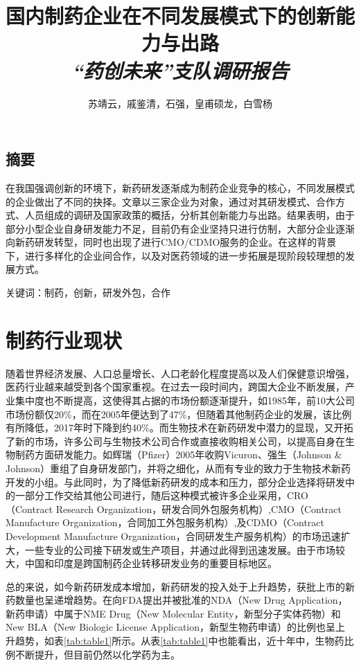 \documentclass[twocolumn]{ctexbook}
\title{\textbf{国内制药企业在不同发展模式下的创新能力与出路}\\{\textit{“药创未来”支队调研报告}}}
\author{苏靖云，戚鉴清，石强，皇甫硕龙，白雪杨}
\begin{document}
\frontmatter
\onecolumn

\begin{spacing}{2.0}
\chapter{摘要}
	

	


	在我国强调创新的环境下，新药研发逐渐成为制药企业竞争的核心，不同发展模式的企业做出了不同的抉择。文章以三家企业为对象，通过对其研发模式、合作方式、人员组成的调研及国家政策的概括，分析其创新能力与出路。结果表明，由于部分小型企业自身研发能力不足，目前仍有企业坚持只进行仿制，大部分企业逐渐向新药研发转型，同时也出现了进行CMO/CDMO服务的企业。在这样的背景下，进行多样化的企业间合作，以及对医药领域的进一步拓展是现阶段较理想的发展方式。
	
	关键词：制药，创新，研发外包，合作



\tableofcontents
\end{spacing}
\twocolumn
\mainmatter

\chapter{制药行业现状}

随着世界经济发展、人口总量增长、人口老龄化程度提高以及人们保健意识增强，医药行业越来越受到各个国家重视。在过去一段时间内，跨国大企业不断发展，产业集中度也不断提高，这使得其占据的市场份额逐渐提升，如1985年，前10大公司市场份额仅20\%，而在2005年便达到了47\%\citep{RN7}，但随着其他制药企业的发展，该比例有所降低，2017年时下降到约40\%\citep{RN1}。而生物技术在新药研发中潜力的显现，又开拓了新的市场，许多公司与生物技术公司合作或直接收购相关公司，以提高自身在生物制药方面研发能力\citep{RN8}。如辉瑞（Pfizer）2005年收购Vicuron、强生（Johnson \& Johnson）重组了自身研发部门，并将之细化，从而有专业的致力于生物技术新药开发的小组。与此同时，为了降低新药研发的成本和压力，部分企业选择将研发中的一部分工作交给其他公司进行，随后这种模式被许多企业采用，CRO（Contract Research Organization，研发合同外包服务机构）,CMO（Contract Manufacture Organization，合同加工外包服务机构）,及CDMO（Contract Development Manufacture Organization，合同研发生产服务机构）的市场迅速扩大\citep{RN2}，一些专业的公司接下研发或生产项目，并通过此得到迅速发展。由于市场较大，中国和印度是跨国制药企业转移研发业务的重要目标地区\citep{RN7}。

总的来说，如今新药研发成本增加，新药研发的投入处于上升趋势，获批上市的新药数量也呈递增趋势\citep{RN6}。在向FDA提出并被批准的NDA（New Drug Application，新药申请）中属于NME Drug（New Molecular Entity，新型分子实体药物）和New BLA（New Biologic License Application，新型生物药申请）的比例也呈上升趋势，如表\ref{tab:table1}所示\citep{RN15,RN16,RN17,RN18}。从表\ref{tab:table1}中也能看出，近十年中，生物药比例不断提升，但目前仍然以化学药为主。
\end{document}
